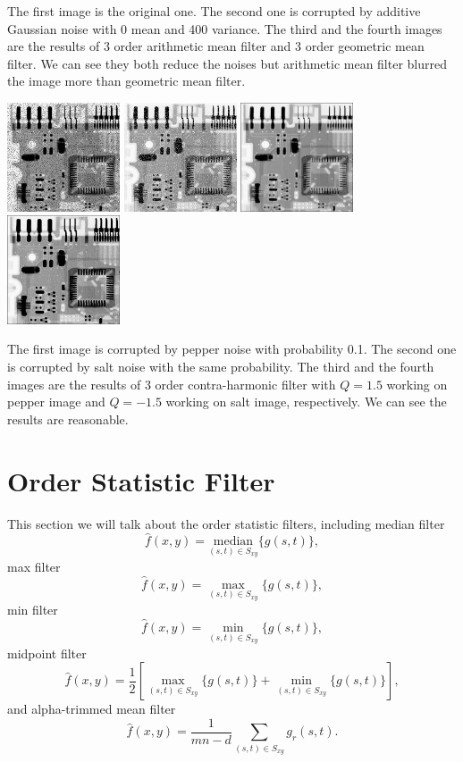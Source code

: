 \documentclass{article}
\begin{document}
The first image is the original one. The second one is corrupted by additive Gaussian noise with 0 mean and 400 variance. The third and the fourth images are the results of 3 order arithmetic mean filter and 3 order geometric mean filter.
We can see they both reduce the noises but arithmetic mean filter blurred the image more than geometric mean filter.

\includegraphics[width=0.25\textwidth]{../data/pepper_Circuit.jpg}
\includegraphics[width=0.25\textwidth]{../data/salt_Circuit.jpg}
\includegraphics[width=0.25\textwidth]{../data/contra_harmonic_mean_pepper_Circuit.jpg}
\includegraphics[width=0.25\textwidth]{../data/contra_harmonic_mean_salt_Circuit.jpg}

The first image is corrupted by pepper noise with probability 0.1. The second one is corrupted by salt noise with the same probability. The third and the fourth images are the results of 3 order contra-harmonic filter with $Q=1.5$ working on pepper image and $Q=-1.5$ working on salt image, respectively. We can see the results are reasonable.

\section{Order Statistic Filter}
This section we will talk about the order statistic filters, including median filter $$\hat{f}(x,y) = \underset{(s,t)\in S_{xy}}{\mathrm{median}}\{g(s,t)\},$$ max filter $$\hat{f}(x,y)=\max\limits_{(s,t)\in S_{xy}}\{g(s,t)\},$$
min filter $$\hat{f}(x,y)=\min\limits_{(s,t)\in S_{xy}}\{g(s,t)\},$$ midpoint filter $$\hat{f}(x,y)=\frac{1}{2}[\max\limits_{(s,t)\in S_{xy}}\{g(s,t)\}+\min\limits_{(s,t)\in S_{xy}}\{g(s,t)\}],$$ and alpha-trimmed mean filter $$\hat{f}(x,y)=\frac{1}{mn-d}\sum_{(s,t)\in S_{xy}}g_r(s,t).$$
\end{document}
